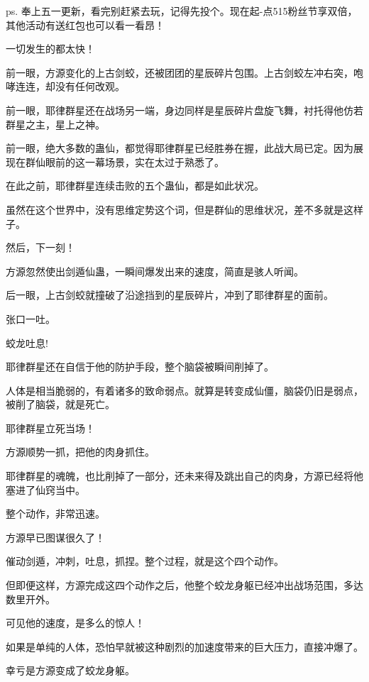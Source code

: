 
\begin{this_body}

ps. 奉上五一更新，看完别赶紧去玩，记得先投个。现在起-点515粉丝节享双倍，其他活动有送红包也可以看一看昂！

一切发生的都太快！

前一眼，方源变化的上古剑蛟，还被团团的星辰碎片包围。上古剑蛟左冲右突，咆哮连连，却没有任何改观。

前一眼，耶律群星还在战场另一端，身边同样是星辰碎片盘旋飞舞，衬托得他仿若群星之主，星上之神。

前一眼，绝大多数的蛊仙，都觉得耶律群星已经胜券在握，此战大局已定。因为展现在群仙眼前的这一幕场景，实在太过于熟悉了。

在此之前，耶律群星连续击败的五个蛊仙，都是如此状况。

虽然在这个世界中，没有思维定势这个词，但是群仙的思维状况，差不多就是这样子。

然后，下一刻！

方源忽然使出剑遁仙蛊，一瞬间爆发出来的速度，简直是骇人听闻。

后一眼，上古剑蛟就撞破了沿途挡到的星辰碎片，冲到了耶律群星的面前。

张口一吐。

蛟龙吐息!

耶律群星还在自信于他的防护手段，整个脑袋被瞬间削掉了。

人体是相当脆弱的，有着诸多的致命弱点。就算是转变成仙僵，脑袋仍旧是弱点，被削了脑袋，就是死亡。

耶律群星立死当场！

方源顺势一抓，把他的肉身抓住。

耶律群星的魂魄，也比削掉了一部分，还未来得及跳出自己的肉身，方源已经将他塞进了仙窍当中。

整个动作，非常迅速。

方源早已图谋很久了！

催动剑遁，冲刺，吐息，抓捏。整个过程，就是这个四个动作。

但即便这样，方源完成这四个动作之后，他整个蛟龙身躯已经冲出战场范围，多达数里开外。

可见他的速度，是多么的惊人！

如果是单纯的人体，恐怕早就被这种剧烈的加速度带来的巨大压力，直接冲爆了。

幸亏是方源变成了蛟龙身躯。


\end{this_body}
